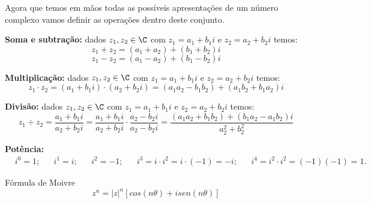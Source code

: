  Agora que temos em mãos todas as possíveis apresentações de um número complexo vamos definir as operações dentro deste conjunto.

 \textbf{Soma e subtração:} dados $z_1, z_2 \in \C$ com $z_1= a_1 + b_1i$ e $z_2= a_2 + b_2i$ temos:
 \[z_1 + z_2= (a_1 + a_2) + (b_1 + b_2)i \]
 \[z_1 - z_2= (a_1 - a_2) + (b_1 - b_2)i \]

 \textbf{Multiplicação:} dados $z_1, z_2 \in \C$ com $z_1= a_1 + b_1i$ e $z_2= a_2 + b_2i$ temos:
 \[z_1 \cdot z_2= (a_1 + b_1i) \cdot (a_2 + b_2i)= (a_1a_2 - b_1b_2) + (a_1b_2 + b_1a_2)i \]

 \textbf{Divisão:} dados $z_1, z_2 \in \C$ com $z_1= a_1 + b_1i$ e $z_2= a_2 + b_2i$ temos:
 \[z_1 \div z_2= \frac{a_1 + b_1i}{a_2 + b_2i}= \frac{a_1 + b_1i}{a_2 + b_2i} \cdot \frac{a_2 - b_2i}{a_2 - b_2i} = \frac{(a_1a_2 + b_1b_2) + (b_1a_2 - a_1b_2)i}{a_2^2 + b_2^2} \]

 \textbf{Potência:}
 \begin{align*}
 & i^0= 1 ;& & i^1= i; & & i^2= -1; & & i^3= i \cdot i^2= i \cdot (-1)= -i; & & i^4= i^2 \cdot i^2= (-1)(-1)= 1 .&
 \end{align*}

 Fórmula de Moivre
 \begin{equation}
  z^n= |z|^n[cos(n \theta) + i sen(n \theta)]
 \end{equation}

 \newpage

